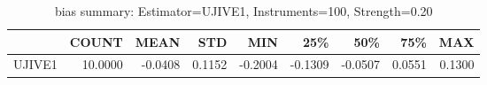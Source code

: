\begin{table}[ht]
\centering
\caption{bias summary: Estimator=UJIVE1, Instruments=100, Strength=0.20}
\begin{tabular}{lrrrrrrrr}
\toprule
 & COUNT & MEAN & STD & MIN & 25\% & 50\% & 75\% & MAX \\
\midrule
UJIVE1 & 10.0000 & -0.0408 & 0.1152 & -0.2004 & -0.1309 & -0.0507 & 0.0551 & 0.1300 \\
\bottomrule
\end{tabular}
\end{table}
